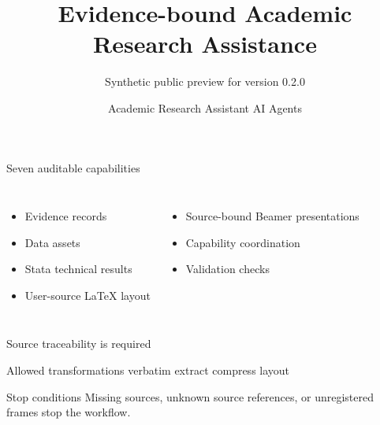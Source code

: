 \documentclass[aspectratio=169]{beamer}
\title{Evidence-bound Academic Research Assistance}
\subtitle{Synthetic public preview for version 0.2.0}
\author{Academic Research Assistant AI Agents}
\date{}
\begin{document}
\begin{frame}
  \label{slide:title}
  \titlepage
\end{frame}

\begin{frame}{Seven auditable capabilities}
  \label{slide:capabilities}
  \begin{columns}[T]
    \begin{itemize}
      \item Evidence records
      \item Data assets
      \item Stata technical results
      \item User-source \LaTeX{} layout
    \end{itemize}
    \begin{itemize}
      \item Source-bound Beamer presentations
      \item Capability coordination
      \item Validation checks
    \end{itemize}
  \end{columns}
\end{frame}

\begin{frame}{Source traceability is required}
  \label{slide:traceability}
  \begin{block}{Allowed transformations}
    verbatim \quad extract \quad compress \quad layout
  \end{block}
  \begin{alertblock}{Stop conditions}
    Missing sources, unknown source references, or unregistered frames stop the workflow.
  \end{alertblock}
\end{frame}
\end{document}
